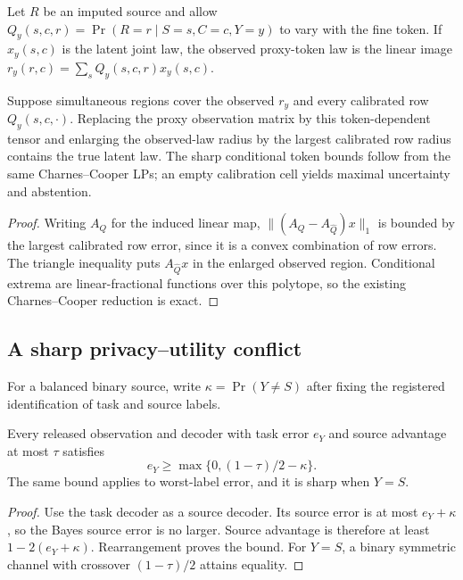 Let $R$ be an imputed source and allow
$Q_y(s,c,r)=\Pr(R=r\mid S=s,C=c,Y=y)$ to vary with the fine token. If
$x_y(s,c)$ is the latent joint law, the observed proxy-token law is the linear
image
$r_y(r,c)=\sum_sQ_y(s,c,r)x_y(s,c)$.

\begin{theorem}
Suppose simultaneous regions cover the observed $r_y$ and every calibrated
row $Q_y(s,c,\cdot)$. Replacing the proxy observation matrix by this
token-dependent tensor and enlarging the observed-law radius by the largest
calibrated row radius contains the true latent law. The sharp conditional
token bounds follow from the same Charnes--Cooper LPs; an empty calibration
cell yields maximal uncertainty and abstention.
\end{theorem}

\begin{proof}
Writing $A_Q$ for the induced linear map,
$\|(A_Q-A_{\widehat Q})x\|_1$ is bounded by the largest calibrated row error,
since it is a convex combination of row errors. The triangle inequality puts
$A_{\widehat Q}x$ in the enlarged observed region. Conditional extrema are
linear-fractional functions over this polytope, so the existing
Charnes--Cooper reduction is exact.
\end{proof}

\subsection{A sharp privacy--utility conflict}

For a balanced binary source, write
$\kappa=\Pr(Y\neq S)$ after fixing the registered identification of task and
source labels.

\begin{theorem}
Every released observation and decoder with task error $e_Y$ and source
advantage at most $\tau$ satisfies
\[
e_Y\geq\max\{0,(1-\tau)/2-\kappa\}.
\]
The same bound applies to worst-label error, and it is sharp when $Y=S$.
\end{theorem}

\begin{proof}
Use the task decoder as a source decoder. Its source error is at most
$e_Y+\kappa$, so the Bayes source error is no larger. Source advantage is
therefore at least $1-2(e_Y+\kappa)$. Rearrangement proves the bound. For
$Y=S$, a binary symmetric channel with crossover $(1-\tau)/2$ attains
equality.
\end{proof}

